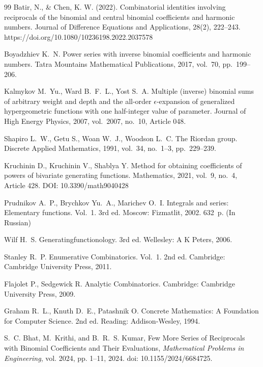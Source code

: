 \documentclass[12pt]{article}
\begin{document}
\begin{thebibliography}{99}
Batir, N., \& Chen, K. W. (2022). Combinatorial identities involving reciprocals of the binomial and central binomial coefficients and harmonic numbers. Journal of Difference Equations and Applications, 28(2), 222–243. https://doi.org/10.1080/10236198.2022.2037578


Boyadzhiev K.~N.
Power series with inverse binomial coefficients and harmonic numbers.
Tatra Mountains Mathematical Publications, 2017, vol.~70, pp.~199--206.

Kalmykov M.~Yu., Ward B.~F.~L., Yost S.~A.
Multiple (inverse) binomial sums of arbitrary weight and depth and the all-order $\epsilon$-expansion of generalized hypergeometric functions with one half-integer value of parameter.
Journal of High Energy Physics, 2007, vol.~2007, no.~10, Article 048.

Shapiro L.~W., Getu S., Woan W.~J., Woodson L.~C.
The Riordan group.
Discrete Applied Mathematics, 1991, vol.~34, no.~1--3, pp.~229--239.

Kruchinin D., Kruchinin V., Shablya Y.
Method for obtaining coefficients of powers of bivariate generating functions.
Mathematics, 2021, vol.~9, no.~4, Article 428.
DOI: 10.3390/math9040428

Prudnikov A.~P., Brychkov Yu.~A., Marichev O.~I.
Integrals and series: Elementary functions.
Vol.~1. 3rd ed.
Moscow: Fizmatlit, 2002. 632~p.
(In Russian)

Wilf H.~S.
Generatingfunctionology.
3rd ed.
Wellesley: A K Peters, 2006.

Stanley R.~P.
Enumerative Combinatorics.
Vol.~1. 2nd ed.
Cambridge: Cambridge University Press, 2011.

Flajolet P., Sedgewick R.
Analytic Combinatorics.
Cambridge: Cambridge University Press, 2009.

Graham R.~L., Knuth D.~E., Patashnik O.
Concrete Mathematics: A Foundation for Computer Science.
2nd ed.
Reading: Addison-Wesley, 1994.


S.~C. Bhat, M.~Krithi, and B.~R.~S. Kumar, Few More Series of Reciprocals with Binomial Coefficients and Their Evaluations, \textit{Mathematical Problems in Engineering}, vol. 2024, pp. 1--11, 2024. doi: 10.1155/2024/6684725.

\end{thebibliography}
\end{document}
